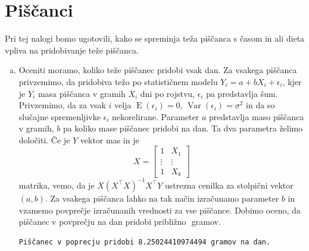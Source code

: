 \documentclass[a4paper,12pt]{article}
\theoremstyle{definition}
\theoremstyle{plain}
\DeclareMathOperator*{\E}{E}
\DeclareMathOperator*{\Var}{Var}
\begin{document}
\section{Piščanci}
Pri tej nalogi bomo ugotovili, kako se spreminja teža piščanca s časom in ali dieta vpliva na pridobivanje teže piščanca.

\begin{enumerate}[a)]
    \item Oceniti moramo, koliko teže piščanec pridobi vsak dan. Za vsakega piščanca privzemimo, da pridobiva težo po statističnem modelu $Y_i = a + b X_i + \epsilon_i$, kjer je $Y_i$ masa piščanca v gramih $X_i$ dni po rojstvu, $\epsilon_i$ pa predstavlja šum. Privzemimo, da za vsak $i$ velja $\E(\epsilon_i) = 0$, $\Var(\epsilon_i) = \sigma^2$ in da so slučajne spremenljivke $\epsilon_i$ nekorelirane. Parameter $a$ predstavlja maso piščanca v gramih, $b$ pa koliko mase piščanec pridobi na dan. Ta dva parametra želimo določiti. Če je $Y$ vektor mas in je 
    $$
    X = \left[
        \begin{array}{cc}
            1 & X_1 \\
            \vdots & \vdots \\
            1 & X_k
        \end{array}
    \right]
    $$ 
    matrika, vemo, da je $X (X^\top X)^{-1} X^\top Y$ ustrezna cenilka za stolpični  vektor $(a, b)$. Za vsakega piščanca lahko na tak način izračunamo parameter $b$ in vzamemo povprečje izračunanih vrednosti za vse piščance. Dobimo oceno, da piščanec v povprečju na dan pridobi približno $ $ gramov.

    \begin{verbatim}
Piščanec v poprecju pridobi 8.25024410974494 gramov na dan.
    \end{verbatim}


\end{enumerate}
\end{document}
